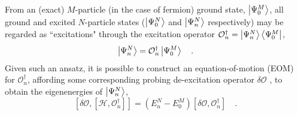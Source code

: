 From an (exact) $M$-particle (in the case of fermion) ground state, $\left\vert \Psi_0^M \right\rangle$, all ground and excited 
$N$-particle states ($\left\vert \Psi_0^N \right\rangle$ and $\left\vert \Psi_n^N \right\rangle$ respectively) may be regarded as ``excitations" through the 
excitation operator $\mathcal{O}^\dagger_n = \left\vert \Psi_n^N \right\rangle\left\langle \Psi_0^M \right\vert$,
\begin{equation}
 \left\vert \Psi_n^N \right\rangle = \mathcal{O}^\dagger_n \left\vert \Psi_0^M \right\rangle \quad.
\end{equation}
Given such an ansatz, it is possible to construct an equation-of-motion (EOM)\cite{SchuckBook_04} for $\mathcal{O}_n^\dagger$, affording some corresponding
probing de-excitation operator $\delta \mathcal{O}$ , to obtain the eigenenergies of $\left\vert \Psi_n^N \right\rangle$,
\begin{equation}
\label{eq:EOM}
 \left[ \delta \mathcal{O},\left[ \mathcal{H}, \mathcal{O}_n^\dagger \right]\right] = (E^N_n - E^M_0)\left[\delta \mathcal{O}, \mathcal{O}^\dagger_n \right]
 \quad.
\end{equation}

